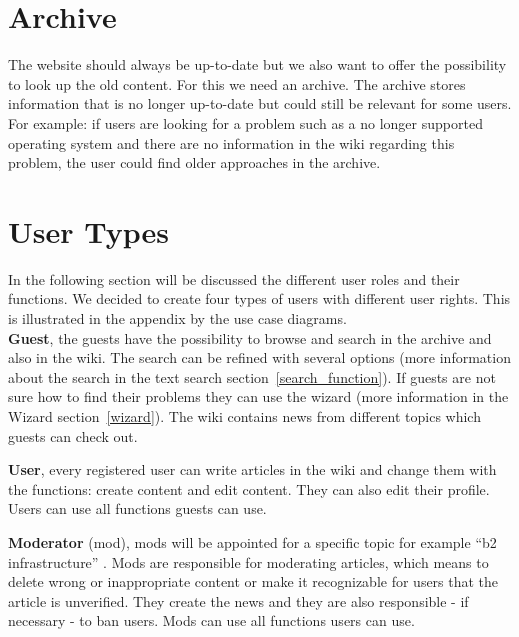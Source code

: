 \section{Archive}
\label{archive}
The website should always be up-to-date but we also want to offer the possibility to look up the old content.
For this we need an archive.
The archive stores information  that is no longer up-to-date but could still be relevant for some users. 
For example: if users are looking for a problem such as a no longer supported operating system and there are no information in the wiki regarding this problem, the user could find older approaches in the archive. 

\section{User Types} 
\label{user_types}
In the following section will be discussed the different user roles and their functions. 
We decided to create four types of users with different user rights. 
This is illustrated in the appendix by the use case diagrams. 
\\
\textbf{Guest}, the guests have the possibility to browse and search in the archive and also in the wiki. 
The search can be refined with several options (more information about the search in the text search section~\ref{search_function}). 
If guests are not sure how to find their problems they can use the wizard (more information in the Wizard section~\ref{wizard}). 
The wiki contains news from different topics which guests can check out.

\textbf{User}, every registered user can write articles in the wiki and change them with the functions: create content and edit content. 
They can also edit their profile. 
Users can use all functions guests can use.

\textbf{Moderator} (mod), mods will be appointed for a specific topic for example “b2 infrastructure” . 
Mods are responsible for moderating articles, which means to delete wrong or inappropriate content or make it recognizable for users that the article is unverified. 
They create the news  and they are also responsible - if necessary - to ban users. 
Mods can use all functions users can use.

